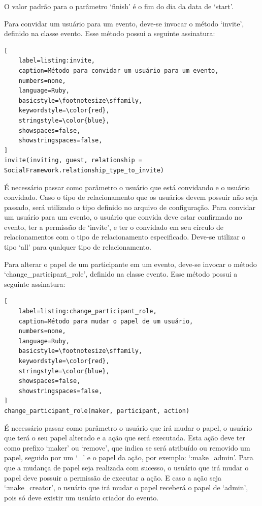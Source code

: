 O valor padrão para o parâmetro `finish' é o fim do dia da data de `start'.

Para convidar um usuário para um evento, deve-se invocar o método `invite', definido na classe evento. Esse método possui a seguinte assinatura:

\begin{lstlisting}[
    label=listing:invite,
    caption=Método para convidar um usuário para um evento,
    numbers=none,
    language=Ruby,
    basicstyle=\footnotesize\sffamily,
    keywordstyle=\color{red},
    stringstyle=\color{blue},
    showspaces=false,
    showstringspaces=false,
]
invite(inviting, guest, relationship = SocialFramework.relationship_type_to_invite)
\end{lstlisting}

É necessário passar como parâmetro o usuário que está convidando e o usuário convidado. Caso o tipo de relacionamento que os usuários devem possuir não seja passado, será utilizado o tipo definido no arquivo de configuração. Para convidar um usuário para um evento, o usuário que convida deve estar confirmado no evento, ter a permissão de `invite', e ter o convidado em seu círculo de relacionamentos com o tipo de relacionamento especificado. Deve-se utilizar o tipo `all' para qualquer tipo de relacionamento.

Para alterar o papel de um participante em um evento, deve-se invocar o método `change\_participant\_role', definido na classe evento. Esse método possui a seguinte assinatura:

\begin{lstlisting}[
    label=listing:change_participant_role,
    caption=Método para mudar o papel de um usuário,
    numbers=none,
    language=Ruby,
    basicstyle=\footnotesize\sffamily,
    keywordstyle=\color{red},
    stringstyle=\color{blue},
    showspaces=false,
    showstringspaces=false,
]
change_participant_role(maker, participant, action)
\end{lstlisting}

É necessário passar como parâmetro o usuário que irá mudar o papel, o usuário que terá o seu papel alterado e a ação que será executada. Esta ação deve ter como prefixo `maker' ou `remove', que indica se será atribuído ou removido um papel, seguido por um `\_' e o papel da ação, por exemplo: `:make\_admin'. Para que a mudança de papel seja realizada com sucesso, o usuário que irá mudar o papel deve possuir a permissão de executar a ação. E caso a ação seja `:make\_creator', o usuário que irá mudar o papel receberá o papel de `admin', pois só deve existir um usuário criador do evento.

